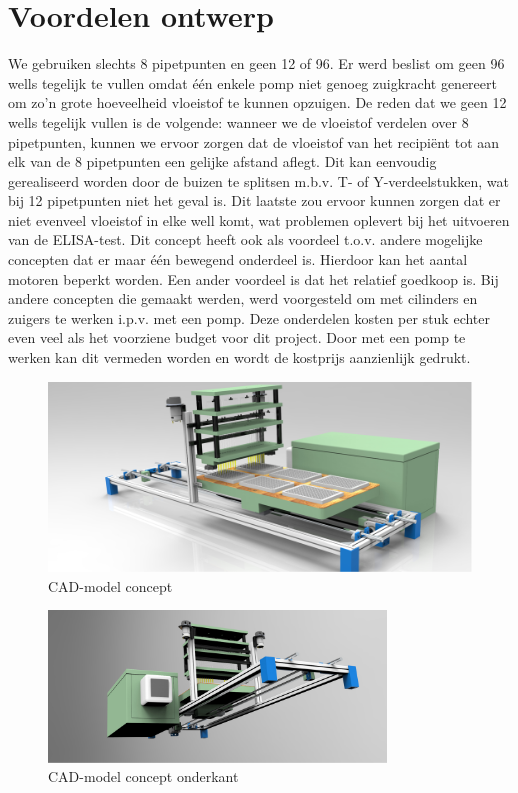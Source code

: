 \documentclass[a4paper,twoside,kulak]{kulakreport} %
\begin{document}
\section{Voordelen ontwerp}
	We gebruiken slechts 8 pipetpunten en geen 12 of 96. Er werd beslist om geen 96 wells tegelijk te vullen omdat één enkele pomp niet genoeg zuigkracht genereert om zo'n grote hoeveelheid vloeistof te kunnen opzuigen. De reden dat we geen 12 wells tegelijk vullen is de volgende: wanneer we de vloeistof verdelen over 8 pipetpunten, kunnen we ervoor zorgen dat de vloeistof van het recipiënt tot aan elk van de 8 pipetpunten een gelijke afstand aflegt. Dit kan eenvoudig gerealiseerd worden door de buizen te splitsen m.b.v. T- of Y-verdeelstukken, wat bij 12 pipetpunten niet het geval is. Dit laatste zou ervoor kunnen zorgen dat er niet evenveel vloeistof in elke well komt, wat problemen oplevert bij het uitvoeren van de ELISA-test. Dit concept heeft ook als voordeel t.o.v. andere mogelijke concepten dat er maar één bewegend onderdeel is. Hierdoor kan het aantal motoren beperkt worden. Een ander voordeel is dat het relatief goedkoop is. Bij andere concepten die gemaakt werden, werd voorgesteld om met cilinders en zuigers te werken i.p.v. met een pomp. Deze onderdelen kosten per stuk echter even veel als het voorziene budget voor dit project. Door met een pomp te werken kan dit vermeden worden en wordt de kostprijs aanzienlijk gedrukt. 
	
\begin{figure}[h]
	\centering
	\includegraphics[width=\textwidth]{renderingBovenaan.png}
	\caption{CAD-model concept}
	\label{fig: CAD-model bovenaan}
	
\end{figure} 

\begin{figure}[h]
	\centering
	\includegraphics[width=0.8\textwidth]{renderingOnderaan.png}
	\caption{CAD-model concept onderkant}
	\label{fig: CAD-model onderaan}
	
\end{figure} 
\end{document}
